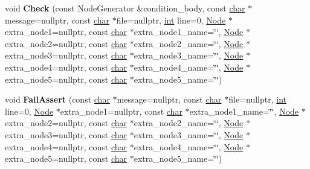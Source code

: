 \begin{DoxyCompactItemize}
\item 
\mbox{\label{classv8_1_1internal_1_1CodeStubAssembler_a014c1d3c21ba57bdfa0914a80be14f85}} 
void {\bfseries Check} (const Node\+Generator \&condition\+\_\+body, const \mbox{\hyperlink{classchar}{char}} $\ast$message=nullptr, const \mbox{\hyperlink{classchar}{char}} $\ast$file=nullptr, \mbox{\hyperlink{classint}{int}} line=0, \mbox{\hyperlink{classv8_1_1internal_1_1compiler_1_1Node}{Node}} $\ast$extra\+\_\+node1=nullptr, const \mbox{\hyperlink{classchar}{char}} $\ast$extra\+\_\+node1\+\_\+name=\char`\"{}\char`\"{}, \mbox{\hyperlink{classv8_1_1internal_1_1compiler_1_1Node}{Node}} $\ast$extra\+\_\+node2=nullptr, const \mbox{\hyperlink{classchar}{char}} $\ast$extra\+\_\+node2\+\_\+name=\char`\"{}\char`\"{}, \mbox{\hyperlink{classv8_1_1internal_1_1compiler_1_1Node}{Node}} $\ast$extra\+\_\+node3=nullptr, const \mbox{\hyperlink{classchar}{char}} $\ast$extra\+\_\+node3\+\_\+name=\char`\"{}\char`\"{}, \mbox{\hyperlink{classv8_1_1internal_1_1compiler_1_1Node}{Node}} $\ast$extra\+\_\+node4=nullptr, const \mbox{\hyperlink{classchar}{char}} $\ast$extra\+\_\+node4\+\_\+name=\char`\"{}\char`\"{}, \mbox{\hyperlink{classv8_1_1internal_1_1compiler_1_1Node}{Node}} $\ast$extra\+\_\+node5=nullptr, const \mbox{\hyperlink{classchar}{char}} $\ast$extra\+\_\+node5\+\_\+name=\char`\"{}\char`\"{})
\item 
\mbox{\label{classv8_1_1internal_1_1CodeStubAssembler_a803a7ac5f39f8b1698ed9fd213f3f860}} 
void {\bfseries Fail\+Assert} (const \mbox{\hyperlink{classchar}{char}} $\ast$message=nullptr, const \mbox{\hyperlink{classchar}{char}} $\ast$file=nullptr, \mbox{\hyperlink{classint}{int}} line=0, \mbox{\hyperlink{classv8_1_1internal_1_1compiler_1_1Node}{Node}} $\ast$extra\+\_\+node1=nullptr, const \mbox{\hyperlink{classchar}{char}} $\ast$extra\+\_\+node1\+\_\+name=\char`\"{}\char`\"{}, \mbox{\hyperlink{classv8_1_1internal_1_1compiler_1_1Node}{Node}} $\ast$extra\+\_\+node2=nullptr, const \mbox{\hyperlink{classchar}{char}} $\ast$extra\+\_\+node2\+\_\+name=\char`\"{}\char`\"{}, \mbox{\hyperlink{classv8_1_1internal_1_1compiler_1_1Node}{Node}} $\ast$extra\+\_\+node3=nullptr, const \mbox{\hyperlink{classchar}{char}} $\ast$extra\+\_\+node3\+\_\+name=\char`\"{}\char`\"{}, \mbox{\hyperlink{classv8_1_1internal_1_1compiler_1_1Node}{Node}} $\ast$extra\+\_\+node4=nullptr, const \mbox{\hyperlink{classchar}{char}} $\ast$extra\+\_\+node4\+\_\+name=\char`\"{}\char`\"{}, \mbox{\hyperlink{classv8_1_1internal_1_1compiler_1_1Node}{Node}} $\ast$extra\+\_\+node5=nullptr, const \mbox{\hyperlink{classchar}{char}} $\ast$extra\+\_\+node5\+\_\+name=\char`\"{}\char`\"{})

\end{DoxyCompactItemize}

